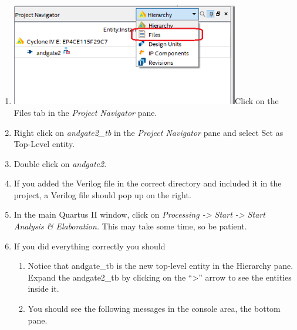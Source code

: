 \documentclass[
]{article}
\begin{document}
\begin{enumerate}
  \begin{enumerate}
  \def\labelenumii{\alph{enumii}.}
  \item
    Select \emph{EDA Tool Options} from the Category menu,
  \item
    If the last row, ``ModelSim-Altera'' is blank, click on the \ldots{}
    button at right and navigate to the
    \emph{C:\textbackslash intelFPGA\_lite\textbackslash18.1\textbackslash modelsim\_ase\textbackslash{}},
    select the \emph{win32aloem} folder, the click Select Folder,
  \item
    Click Ok.
  \end{enumerate}
\item
  \includegraphics[width=3.91975in,height=1.76389in]{vertopal_3cb071cd52e44dfb8dc5befe7ee47074/media/image1.png}Click
  on the Files tab in the \emph{Project Navigator} pane.
\item
  Right click on \emph{andgate2\_tb} in the \emph{Project Navigator}
  pane and select Set as Top-Level entity.
\item
  Double click on \emph{andgate2}.
\item
  If you added the Verilog file in the correct directory and included it
  in the project, a Verilog file should pop up on the right.
\item
  In the main Quartus II window, click on \emph{Processing
  -\textgreater{} Start -\textgreater{} Start Analysis \& Elaboration.}
  This may take some time, so be patient.
\item
  If you did everything correctly you should

  \begin{enumerate}
  \def\labelenumii{\alph{enumii}.}
  \item
    Notice that andgate\_tb is the new top-level entity in the Hierarchy
    pane. Expand the andgate2\_tb by clicking on the ``\textgreater''
    arrow to see the entities inside it.
  \item
    You should see the following messages in the console area, the
    bottom pane.
  \end{enumerate}
\end{enumerate}
\end{document}
